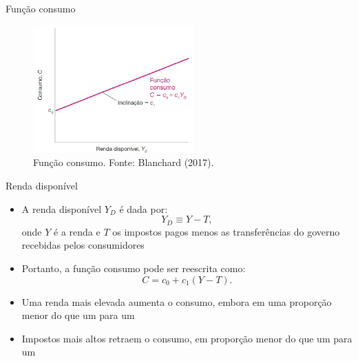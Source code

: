 \documentclass[10pt]{beamer}
\begin{document}
\begin{frame}{Função consumo}
    \begin{figure}
        \centering
        \includegraphics[width=0.55\textwidth]{./figures/aula5_fig7.PNG}
        \caption{Função consumo. Fonte: Blanchard (2017).}
        \label{aula5_fig7}
    \end{figure}
\end{frame}

\begin{frame}{Renda disponível}
    \begin{itemize}
        \item A renda disponível $Y_D$ é dada por:
        \begin{equation}
            Y_D \equiv Y - T,
        \end{equation}
        onde $Y$ é a renda e $T$ os impostos pagos menos as transferências do governo recebidas pelos consumidores\bigskip
         
        \item Portanto, a função consumo pode ser reescrita como:
        \begin{equation}
            C = c_0 + c_1(Y-T).
        \end{equation}
         
        \item Uma renda mais elevada aumenta o consumo, embora em uma proporção menor do que um para um\bigskip
         
        \item Impostos mais altos retraem o consumo, em proporção menor do que um para um
    \end{itemize}
\end{frame}
\end{document}
